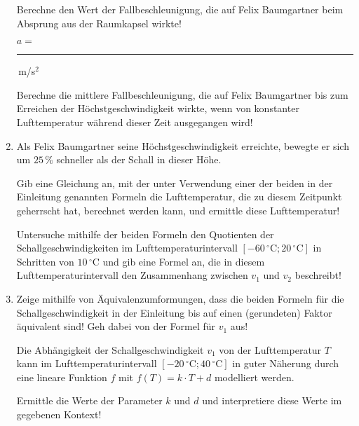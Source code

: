 \begin{langesbeispiel}
\begin{enumerate}
	Berechne den Wert der Fallbeschleunigung, die auf Felix Baumgartner beim Absprung aus der Raumkapsel wirkte!\leer
	
	$a=$ \rule{3cm}{0.3pt}\,m/s$^2$\leer
	
	Berechne die mittlere Fallbeschleunigung, die auf Felix Baumgartner bis zum Erreichen der Höchstgeschwindigkeit wirkte, wenn von konstanter Lufttemperatur während dieser Zeit ausgegangen wird!\leer
	
	\item Als Felix Baumgartner seine Höchstgeschwindigkeit erreichte, bewegte er sich um $25\,\%$ schneller als der Schall in dieser Höhe.\leer
	
	Gib eine Gleichung an, mit der unter Verwendung einer der beiden in der Einleitung genannten Formeln die Lufttemperatur, die zu diesem Zeitpunkt geherrscht hat, berechnet werden kann, und ermittle diese Lufttemperatur!\leer
	
	Untersuche mithilfe der beiden Formeln den Quotienten der Schallgeschwindigkeiten im Lufttemperaturintervall $[-60\,^\circ\text{C}; 20\,^\circ\text{C}]$ in Schritten von $10\,^\circ\text{C}$ und gib eine Formel an, die in diesem Lufttemperaturintervall den Zusammenhang zwischen $v_1$ und $v_2$ beschreibt!\leer
	
	\item Zeige mithilfe von Äquivalenzumformungen, dass die beiden Formeln für die Schallgeschwindigkeit in der Einleitung bis auf einen (gerundeten) Faktor äquivalent sind! Geh dabei von der Formel für $v_1$ aus!\leer
	
	Die Abhängigkeit der Schallgeschwindigkeit $v_1$ von der Lufttemperatur $T$ kann im Lufttemperaturintervall $[-20\,^\circ\text{C}; 40\,^\circ\text{C}]$ in guter Näherung durch eine lineare Funktion $f$ mit $f(T)=k\cdot T+d$ modelliert werden.
	
	Ermittle die Werte der Parameter $k$ und $d$ und interpretiere diese Werte im gegebenen Kontext!
	
\end{enumerate}

\end{langesbeispiel}
